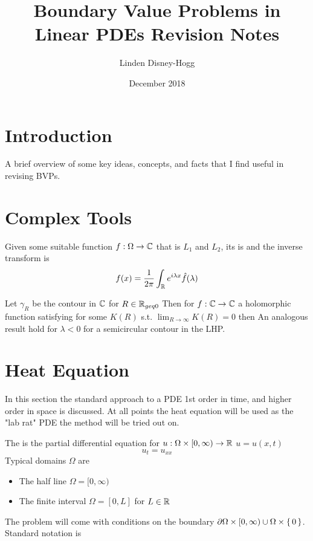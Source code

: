\documentclass{article}
\title{Boundary Value Problems in Linear PDEs Revision Notes}
\author{Linden Disney-Hogg}
\date{December 2018}
\begin{document}
\maketitle
\tableofcontents

\section{Introduction}
A brief overview of some key ideas, concepts, and facts that I find useful in revising BVPs. 

\section{Complex Tools}
\begin{definition}
Given some suitable function $f:\Omega \to \mathbb{C}$ that is $L_1$ and $L_2$, its  is 
and the inverse transform is 
\[
f(x) = \frac{1}{2\pi} \int_{\mathbb{R}} e^{i\lambda x} \hat{f}(\lambda)
\]
\end{definition}

\begin{lemma}
Let $\gamma_R$ be the contour in $\mathbb{C}$ for $R\in\mathbb{R}_{geq 0}$
Then for $f:\mathbb{C}\to\mathbb{C}$ a holomorphic function satisfying 
for some $K(R)$ s.t. $\lim_{R\to\infty} K(R) = 0$ then 
An analogous result hold for $\lambda <0$ for a semicircular contour in the LHP. 
\end{lemma}
\section{Heat Equation}
In this section the standard approach to a PDE 1st order in time, and higher order in space is discussed. At all points the heat equation will be used as the "lab rat" PDE the method will be tried out on. \\
\begin{definition}
The  is the partial differential equation for $u:\Omega \times [0,\infty) \to \mathbb{R}$ $u=u(x,t)$
\[
u_t = u_{xx}
\]
Typical domains $\Omega$ are 
\begin{itemize}
    \item The half line $\Omega = [0,\infty)$
    \item The  finite interval $\Omega = [0,L]$ for $L\in\mathbb{R}$
\end{itemize}
The problem will come with conditions on the boundary $\partial \Omega \times [0,\infty) \cup \Omega\times \set{0}$. Standard notation is 
\end{definition}
\end{document}
